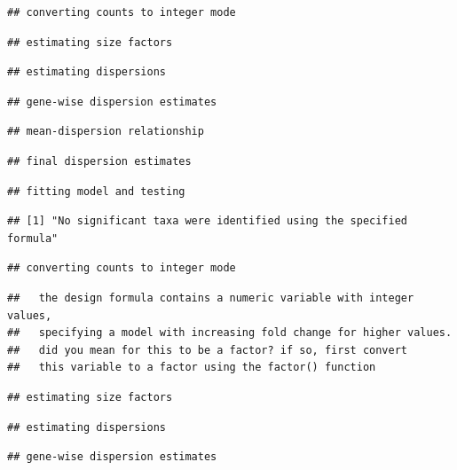 \documentclass[]{article}
\begin{document}
\begin{verbatim}
## converting counts to integer mode
\end{verbatim}

\begin{verbatim}
## estimating size factors
\end{verbatim}

\begin{verbatim}
## estimating dispersions
\end{verbatim}

\begin{verbatim}
## gene-wise dispersion estimates
\end{verbatim}

\begin{verbatim}
## mean-dispersion relationship
\end{verbatim}

\begin{verbatim}
## final dispersion estimates
\end{verbatim}

\begin{verbatim}
## fitting model and testing
\end{verbatim}

\begin{verbatim}
## [1] "No significant taxa were identified using the specified formula"
\end{verbatim}

\begin{verbatim}
## converting counts to integer mode
\end{verbatim}

\begin{verbatim}
##   the design formula contains a numeric variable with integer values,
##   specifying a model with increasing fold change for higher values.
##   did you mean for this to be a factor? if so, first convert
##   this variable to a factor using the factor() function
\end{verbatim}

\begin{verbatim}
## estimating size factors
\end{verbatim}

\begin{verbatim}
## estimating dispersions
\end{verbatim}

\begin{verbatim}
## gene-wise dispersion estimates
\end{verbatim}
\end{document}
